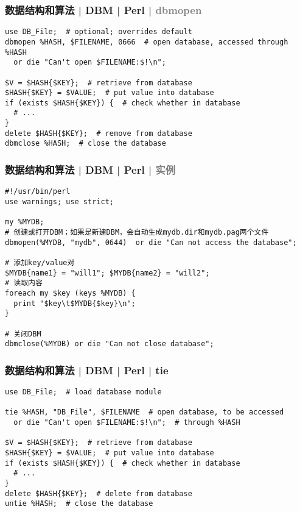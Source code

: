 \begin{frame}[fragile]
  \frametitle{数据结构和算法 | DBM | Perl | \textcolor{gray}{dbmopen}}
\begin{lstlisting}
use DB_File;  # optional; overrides default
dbmopen %HASH, $FILENAME, 0666  # open database, accessed through %HASH
  or die "Can't open $FILENAME:$!\n";

$V = $HASH{$KEY};  # retrieve from database
$HASH{$KEY} = $VALUE;  # put value into database
if (exists $HASH{$KEY}) {  # check whether in database
  # ...
}
delete $HASH{$KEY};  # remove from database
dbmclose %HASH;  # close the database
\end{lstlisting}
\end{frame}

\begin{frame}[fragile]
  \frametitle{数据结构和算法 | DBM | Perl | \textcolor{gray}{实例}}
\begin{lstlisting}[basicstyle=\small\tt]
#!/usr/bin/perl
use warnings; use strict;
 
my %MYDB;
# 创建或打开DBM；如果是新建DBM，会自动生成mydb.dir和mydb.pag两个文件
dbmopen(%MYDB, "mydb", 0644)  or die "Can not access the database";

# 添加key/value对
$MYDB{name1} = "will1"; $MYDB{name2} = "will2";
# 读取内容
foreach my $key (keys %MYDB) {
  print "$key\t$MYDB{$key}\n";
}

# 关闭DBM
dbmclose(%MYDB) or die "Can not close database";
\end{lstlisting}
\end{frame}

\begin{frame}[fragile]
  \frametitle{数据结构和算法 | DBM | Perl | tie}
\begin{lstlisting}
use DB_File;  # load database module

tie %HASH, "DB_File", $FILENAME  # open database, to be accessed
  or die "Can't open $FILENAME:$!\n";  # through %HASH

$V = $HASH{$KEY};  # retrieve from database
$HASH{$KEY} = $VALUE;  # put value into database
if (exists $HASH{$KEY}) {  # check whether in database
  # ...
}
delete $HASH{$KEY};  # delete from database
untie %HASH;  # close the database
\end{lstlisting}
\end{frame}

